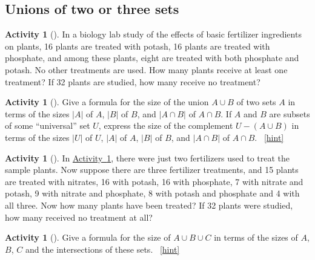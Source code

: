 \documentclass[10pt,]{book}
\theoremstyle{plain}
\theoremstyle{definition}
\theoremstyle{definition}
\theoremstyle{definition}
\newtheorem{activity}[project]{Activity}
\numberwithin{equation}{chapter}
\begin{document}
\subsection[{Unions of two or three sets}]{Unions of two or three sets}\label{subsection-15}
\begin{activity}[]\label{fertilizer2}
\hypertarget{p-750}{}%
In a biology lab study of the effects of basic fertilizer ingredients on plants, 16 plants are treated with potash, 16 plants are treated with phosphate, and among these plants, eight are treated with both phosphate and potash. No other treatments are used. How many plants receive at least one treatment? If 32 plants are studied, how many receive no treatment?%
\end{activity}
\begin{activity}[]\label{twosetintersection}
\hypertarget{p-752}{}%
Give a formula for the size of the union \(A\cup B\) of two sets \(A\) in terms of the sizes \(|A|\) of \(A\), \(|B|\) of \(B\), and \(|A\cap B|\) of \(A\cap B\). If \(A\) and \(B\) are subsets of some ``universal'' set \(U\), express the size of the complement \(U-(A\cup B)\) in terms of the sizes \(|U|\) of \(U\), \(|A|\) of \(A\), \(|B|\) of \(B\), and \(|A\cap B|\) of \(A\cap B\).%
~\hfill{\tiny\hyperlink{a-155}{[hint]}\hypertarget{q-155}{}}\end{activity}
\begin{activity}[]\label{activity-156}
\hypertarget{p-756}{}%
In \hyperref[fertilizer2]{Activity~\ref{fertilizer2}}, there were just two fertilizers used to treat the sample plants. Now suppose there are three fertilizer treatments, and 15 plants are treated with nitrates, 16 with potash, 16 with phosphate, 7 with nitrate and potash, 9 with nitrate and phosphate, 8 with potash and phosphate and 4 with all three. Now how many plants have been treated? If 32 plants were studied, how many received no treatment at all?%
\end{activity}
\begin{activity}[]\label{threesetintersection}
\hypertarget{p-758}{}%
Give a formula for the size of \(A\cup B\cup C\) in terms of the sizes of \(A\), \(B\), \(C\) and the intersections of these sets.%
~\hfill{\tiny\hyperlink{a-157}{[hint]}\hypertarget{q-157}{}}\end{activity}
\typeout{************************************************}
\typeout{************************************************}
\end{document}
